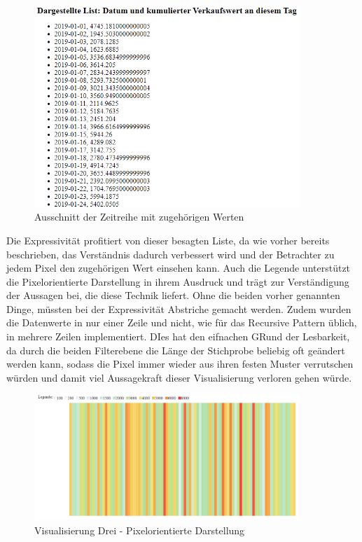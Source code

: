 \documentclass[usegeometry=true]{scrartcl}
\begin{document}
\begin{figure} [H]
	\begin{center}
		\includegraphics[width=10cm]{IMG/Zeitreihe}
		\caption{Ausschnitt der Zeitreihe mit zugehörigen Werten}
		\label{fig:Zeitreihe}
	\end{center}
\end{figure}

\noindent Die Expressivität profitiert von dieser besagten Liste, da wie vorher bereits beschrieben, das Verständnis dadurch verbessert wird und der Betrachter zu jedem Pixel den zugehörigen
Wert einsehen kann. Auch die Legende unterstützt die Pixelorientierte Darstellung in ihrem Ausdruck und trägt zur Verständigung der Aussagen bei, die diese Technik liefert. Ohne
die beiden vorher genannten Dinge, müssten bei der Expressivität Abstriche gemacht werden. Zudem wurden die Datenwerte in nur einer Zeile und nicht, wie für das Recursive
Pattern üblich, in mehrere Zeilen implementiert. DIes hat den eifnachen GRund der Lesbarkeit, da durch die beiden Filterebene die Länge der Stichprobe beliebig oft geändert werden
kann, sodass die Pixel immer wieder aus ihren festen Muster verrutschen würden und damit viel Aussagekraft dieser Visualisierung verloren gehen würde. \\

\begin{figure} [H]
	\begin{center}
		\includegraphics[width=10cm]{IMG/RecursivePattern.png}
		\caption{Visualisierung Drei - Pixelorientierte Darstellung}
		\label{fig:Zeitreihe}
	\end{center}
\end{figure}
\end{document}
